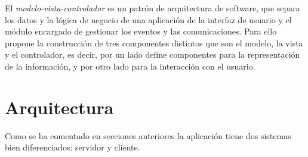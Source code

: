 El \emph{modelo-vista-controlador} es un patrón de arquitectura de software, que separa los datos y la lógica de negocio de una aplicación de la interfaz de usuario y el módulo encargado de gestionar los eventos y las comunicaciones. Para ello propone la construcción de tres componentes distintos que son el modelo, la vista y el controlador, es decir, por un lado define componentes para la representación de la información, y por otro lado para la interacción con el usuario.





\section{Arquitectura}\label{arquitectura}

Como se ha comentado en secciones anteriores la aplicación tiene dos sistemas bien diferenciados: servidor y cliente. 

